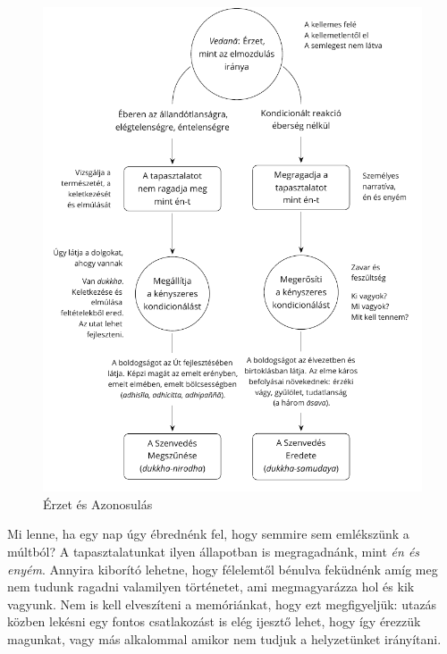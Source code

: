 \begin{figure}[h]
\vspace*{-15pt}
\caption{Érzet és Azonosulás}\label{fig-feeling-identification}
\bigskip
\includegraphics[width=\linewidth]{./manuscript/tex/diagrams/feeling-identification-hu.pdf}
\vspace*{\baselineskip}
\end{figure}

\clearpage
\normalpagelayout

Mi lenne, ha egy nap úgy ébrednénk fel, hogy semmire sem emlékszünk a
múltból? A tapasztalatunkat ilyen állapotban is megragadnánk, mint
\emph{én és enyém}. Annyira kiborító lehetne, hogy félelemtől bénulva
feküdnénk amíg meg nem tudunk ragadni valamilyen történetet, ami
megmagyarázza hol és kik vagyunk. Nem is kell elveszíteni a memóriánkat,
hogy ezt megfigyeljük: utazás közben lekésni egy fontos csatlakozást is
elég ijesztő lehet, hogy így érezzük magunkat, vagy más alkalommal
amikor nem tudjuk a helyzetünket irányítani.

